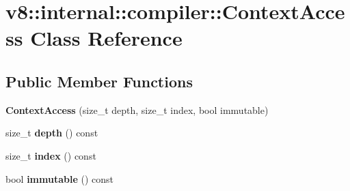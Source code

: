 \hypertarget{classv8_1_1internal_1_1compiler_1_1_context_access}{}\section{v8\+:\+:internal\+:\+:compiler\+:\+:Context\+Access Class Reference}
\label{classv8_1_1internal_1_1compiler_1_1_context_access}
\subsection*{Public Member Functions}
\begin{DoxyCompactItemize}
\item 
{\bfseries Context\+Access} (size\+\_\+t depth, size\+\_\+t index, bool immutable)\hypertarget{classv8_1_1internal_1_1compiler_1_1_context_access_acccc9ed95a7216cb0af5cc441dfa6be7}{}\label{classv8_1_1internal_1_1compiler_1_1_context_access_acccc9ed95a7216cb0af5cc441dfa6be7}

\item 
size\+\_\+t {\bfseries depth} () const \hypertarget{classv8_1_1internal_1_1compiler_1_1_context_access_ac5c4f80dc26914a6071b40a2f59060c0}{}\label{classv8_1_1internal_1_1compiler_1_1_context_access_ac5c4f80dc26914a6071b40a2f59060c0}

\item 
size\+\_\+t {\bfseries index} () const \hypertarget{classv8_1_1internal_1_1compiler_1_1_context_access_adc596aef20eca9f07e4842cf42634d4f}{}\label{classv8_1_1internal_1_1compiler_1_1_context_access_adc596aef20eca9f07e4842cf42634d4f}

\item 
bool {\bfseries immutable} () const \hypertarget{classv8_1_1internal_1_1compiler_1_1_context_access_a797ada72fccc9c673df42bbd2b98f6f8}{}\label{classv8_1_1internal_1_1compiler_1_1_context_access_a797ada72fccc9c673df42bbd2b98f6f8}

\end{DoxyCompactItemize}
